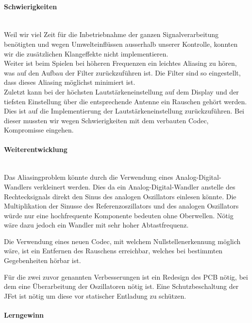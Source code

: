 \paragraph{Schwierigkeiten}\mbox{}\\

Weil wir viel Zeit für die Inbetriebnahme der ganzen Signalverarbeitung benötigten und wegen Umwelteinflüssen ausserhalb unserer Kontrolle, konnten wir die zusätzlichen Klangeffekte nicht implementieren.\\
Weiter ist beim Spielen bei höheren Frequenzen ein leichtes Aliasing zu hören, was auf den Aufbau der Filter zurückzuführen ist. Die Filter sind so eingestellt, dass dieses Aliasing möglichst minimiert ist.\\
Zuletzt kann bei der höchsten Lautstärkeneinstellung auf dem Display und der tiefsten Einstellung über die entsprechende Antenne ein Rauschen gehört werden. Dies ist auf die Implementierung der Lautstärkeneinstellung zurückzuführen. Bei dieser mussten wir wegen Schwierigkeiten mit dem verbauten Codec, Kompromisse eingehen.

\paragraph{Weiterentwicklung}\mbox{}\\

Das Aliasingproblem könnte durch die Verwendung eines Analog-Digital-Wandlers verkleinert werden. Dies da ein Analog-Digital-Wandler anstelle des Rechtecksignals direkt den Sinus des analogen Oszillators einlesen könnte. Die Multiplikation der Sinusse des Referenzoszillators und des analogen Oszillators würde nur eine hochfrequente Komponente bedeuten ohne Oberwellen. Nötig wäre dazu jedoch ein Wandler mit sehr hoher Abtastfrequenz.

Die Verwendung eines neuen Codec, mit welchem Nullstellenerkennung möglich wäre, ist ein Entfernen des Rauschens erreichbar, welches bei bestimmten Gegebenheiten hörbar ist.

Für die zwei zuvor genannten Verbesserungen ist ein Redesign des PCB nötig, bei dem eine Überarbeitung der Oszillatoren nötig ist. Eine Schutzbeschaltung der JFet ist nötig um diese vor statischer Entladung zu schützen.

\paragraph{Lerngewinn} \mbox{}\\


